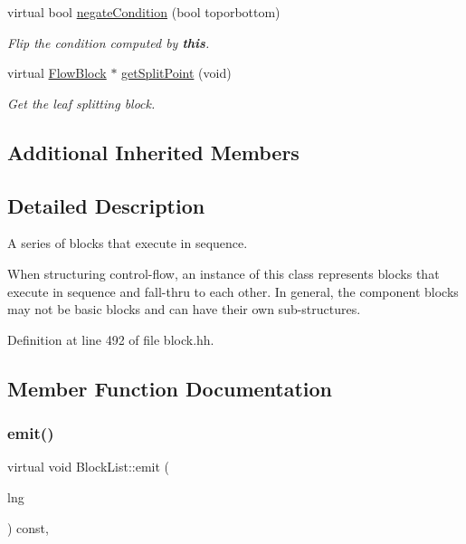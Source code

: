 \begin{DoxyCompactItemize}
virtual bool \mbox{\hyperlink{class_block_list_a97202688e117da20c82ef225318536ca}{negate\+Condition}} (bool toporbottom)
\begin{DoxyCompactList}\small\item\em Flip the condition computed by {\bfseries{this}}. \end{DoxyCompactList}\item 
virtual \mbox{\hyperlink{class_flow_block}{Flow\+Block}} $\ast$ \mbox{\hyperlink{class_block_list_a18e5d3b6de59ea0522dfb1eb96c012c6}{get\+Split\+Point}} (void)
\begin{DoxyCompactList}\small\item\em Get the leaf splitting block. \end{DoxyCompactList}\end{DoxyCompactItemize}
\subsection*{Additional Inherited Members}


\subsection{Detailed Description}
A series of blocks that execute in sequence. 

When structuring control-\/flow, an instance of this class represents blocks that execute in sequence and fall-\/thru to each other. In general, the component blocks may not be basic blocks and can have their own sub-\/structures. 

Definition at line 492 of file block.\+hh.



\subsection{Member Function Documentation}
\mbox{\label{class_block_list_a391529d850ca5f97c74acee00c080c43}} 
\subsubsection{\texorpdfstring{emit()}{emit()}}
{\footnotesize\ttfamily virtual void Block\+List\+::emit (\begin{DoxyParamCaption}\item[{\mbox{\hyperlink{class_print_language}{Print\+Language}} $\ast$}]{lng }\end{DoxyParamCaption}) const\hspace{0.3cm}{\ttfamily [inline]}, {\ttfamily [virtual]}}



